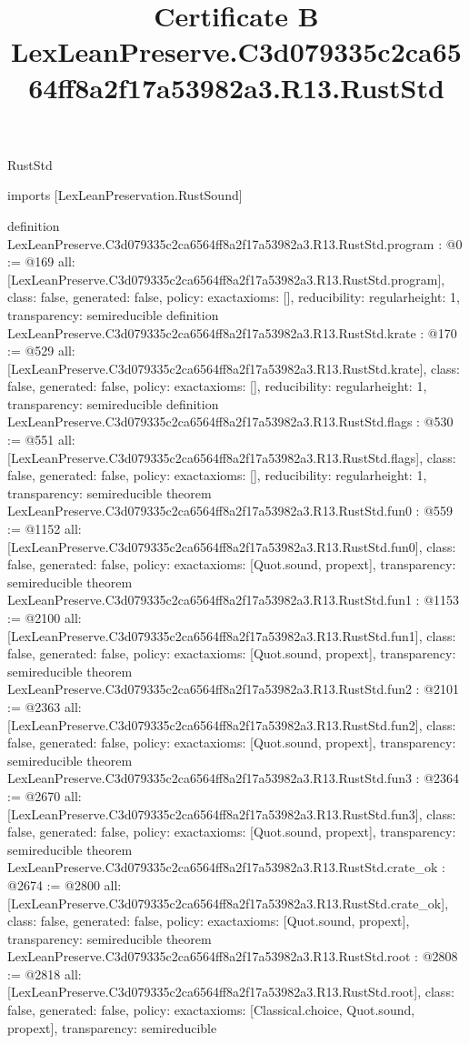 \begin{lexlean}{RustStd}
\title{Certificate B LexLeanPreserve.C3d079335c2ca6564ff8a2f17a53982a3.R13.RustStd}
\begin{coremodule}
imports [LexLeanPreservation.RustSound]

definition LexLeanPreserve.C3d079335c2ca6564ff8a2f17a53982a3.R13.RustStd.program : @0 := @169 {
  all: [LexLeanPreserve.C3d079335c2ca6564ff8a2f17a53982a3.R13.RustStd.program],
  class: false,
  generated: false,
  policy: exact{axioms: []},
  reducibility: regular{height: 1},
  transparency: semireducible
}
definition LexLeanPreserve.C3d079335c2ca6564ff8a2f17a53982a3.R13.RustStd.krate : @170 := @529 {
  all: [LexLeanPreserve.C3d079335c2ca6564ff8a2f17a53982a3.R13.RustStd.krate],
  class: false,
  generated: false,
  policy: exact{axioms: []},
  reducibility: regular{height: 1},
  transparency: semireducible
}
definition LexLeanPreserve.C3d079335c2ca6564ff8a2f17a53982a3.R13.RustStd.flags : @530 := @551 {
  all: [LexLeanPreserve.C3d079335c2ca6564ff8a2f17a53982a3.R13.RustStd.flags],
  class: false,
  generated: false,
  policy: exact{axioms: []},
  reducibility: regular{height: 1},
  transparency: semireducible
}
theorem LexLeanPreserve.C3d079335c2ca6564ff8a2f17a53982a3.R13.RustStd.fun0 : @559 := @1152 {
  all: [LexLeanPreserve.C3d079335c2ca6564ff8a2f17a53982a3.R13.RustStd.fun0],
  class: false,
  generated: false,
  policy: exact{axioms: [Quot.sound, propext]},
  transparency: semireducible
}
theorem LexLeanPreserve.C3d079335c2ca6564ff8a2f17a53982a3.R13.RustStd.fun1 : @1153 := @2100 {
  all: [LexLeanPreserve.C3d079335c2ca6564ff8a2f17a53982a3.R13.RustStd.fun1],
  class: false,
  generated: false,
  policy: exact{axioms: [Quot.sound, propext]},
  transparency: semireducible
}
theorem LexLeanPreserve.C3d079335c2ca6564ff8a2f17a53982a3.R13.RustStd.fun2 : @2101 := @2363 {
  all: [LexLeanPreserve.C3d079335c2ca6564ff8a2f17a53982a3.R13.RustStd.fun2],
  class: false,
  generated: false,
  policy: exact{axioms: [Quot.sound, propext]},
  transparency: semireducible
}
theorem LexLeanPreserve.C3d079335c2ca6564ff8a2f17a53982a3.R13.RustStd.fun3 : @2364 := @2670 {
  all: [LexLeanPreserve.C3d079335c2ca6564ff8a2f17a53982a3.R13.RustStd.fun3],
  class: false,
  generated: false,
  policy: exact{axioms: [Quot.sound, propext]},
  transparency: semireducible
}
theorem LexLeanPreserve.C3d079335c2ca6564ff8a2f17a53982a3.R13.RustStd.crate_ok : @2674 := @2800 {
  all: [LexLeanPreserve.C3d079335c2ca6564ff8a2f17a53982a3.R13.RustStd.crate_ok],
  class: false,
  generated: false,
  policy: exact{axioms: [Quot.sound, propext]},
  transparency: semireducible
}
theorem LexLeanPreserve.C3d079335c2ca6564ff8a2f17a53982a3.R13.RustStd.root : @2808 := @2818 {
  all: [LexLeanPreserve.C3d079335c2ca6564ff8a2f17a53982a3.R13.RustStd.root],
  class: false,
  generated: false,
  policy: exact{axioms: [Classical.choice, Quot.sound, propext]},
  transparency: semireducible
}


\end{coremodule}
\end{lexlean}
